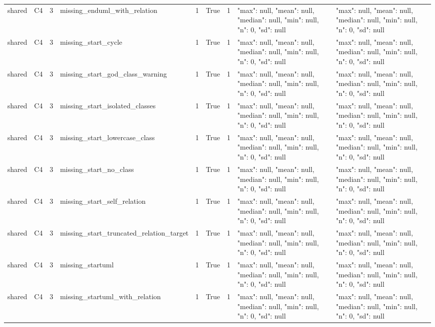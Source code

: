 \begin{tabular}{lllllllll}
shared & C4 & 3 & missing\_enduml\_with\_relation & 1 & True & 1 & {"max": null, "mean": null, "median": null, "min": null, "n": 0, "sd": null} & {"max": null, "mean": null, "median": null, "min": null, "n": 0, "sd": null} \\
shared & C4 & 3 & missing\_start\_cycle & 1 & True & 1 & {"max": null, "mean": null, "median": null, "min": null, "n": 0, "sd": null} & {"max": null, "mean": null, "median": null, "min": null, "n": 0, "sd": null} \\
shared & C4 & 3 & missing\_start\_god\_class\_warning & 1 & True & 1 & {"max": null, "mean": null, "median": null, "min": null, "n": 0, "sd": null} & {"max": null, "mean": null, "median": null, "min": null, "n": 0, "sd": null} \\
shared & C4 & 3 & missing\_start\_isolated\_classes & 1 & True & 1 & {"max": null, "mean": null, "median": null, "min": null, "n": 0, "sd": null} & {"max": null, "mean": null, "median": null, "min": null, "n": 0, "sd": null} \\
shared & C4 & 3 & missing\_start\_lowercase\_class & 1 & True & 1 & {"max": null, "mean": null, "median": null, "min": null, "n": 0, "sd": null} & {"max": null, "mean": null, "median": null, "min": null, "n": 0, "sd": null} \\
shared & C4 & 3 & missing\_start\_no\_class & 1 & True & 1 & {"max": null, "mean": null, "median": null, "min": null, "n": 0, "sd": null} & {"max": null, "mean": null, "median": null, "min": null, "n": 0, "sd": null} \\
shared & C4 & 3 & missing\_start\_self\_relation & 1 & True & 1 & {"max": null, "mean": null, "median": null, "min": null, "n": 0, "sd": null} & {"max": null, "mean": null, "median": null, "min": null, "n": 0, "sd": null} \\
shared & C4 & 3 & missing\_start\_truncated\_relation\_target & 1 & True & 1 & {"max": null, "mean": null, "median": null, "min": null, "n": 0, "sd": null} & {"max": null, "mean": null, "median": null, "min": null, "n": 0, "sd": null} \\
shared & C4 & 3 & missing\_startuml & 1 & True & 1 & {"max": null, "mean": null, "median": null, "min": null, "n": 0, "sd": null} & {"max": null, "mean": null, "median": null, "min": null, "n": 0, "sd": null} \\
shared & C4 & 3 & missing\_startuml\_with\_relation & 1 & True & 1 & {"max": null, "mean": null, "median": null, "min": null, "n": 0, "sd": null} & {"max": null, "mean": null, "median": null, "min": null, "n": 0, "sd": null} \\

\end{tabular}
